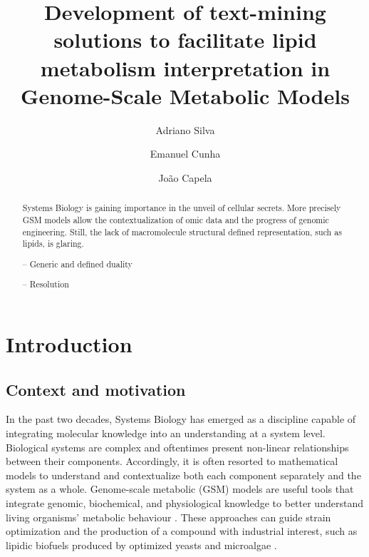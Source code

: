 \documentclass{llncs}
\begin{document}
\pagestyle{myheadings}
\title{Development of text-mining solutions to facilitate lipid metabolism interpretation in Genome-Scale Metabolic Models}

\author{Adriano Silva\and
Emanuel Cunha \and
João Capela}

%
\maketitle              %
%
\begin{abstract}
Systems Biology is gaining importance in the unveil of cellular secrets. More precisely GSM models allow the contextualization of omic data and the progress of genomic engineering.
Still, the lack of macromolecule structural defined representation, such as lipids, is glaring.

-- Generic and defined duality

-- Resolution

\end{abstract}
%
%
%
\section{Introduction}
\subsection{Context and motivation}
In the past two decades, Systems Biology has emerged as a discipline capable of integrating molecular knowledge into an understanding at a system level.
Biological systems are complex and oftentimes present non-linear relationships between their components. Accordingly, it is often resorted to mathematical models to understand and contextualize both each component separately and the system as a whole.
Genome-scale metabolic (GSM) models are useful tools that integrate genomic, biochemical, and physiological knowledge to better understand living organisms' metabolic behaviour \cite{Zou2018,Tavassoly2018}. 
These approaches can guide strain optimization and the production of a compound with industrial interest, such as lipidic biofuels produced by optimized yeasts and microalgae \cite{Sawangkeaw2013}.
\end{document}
